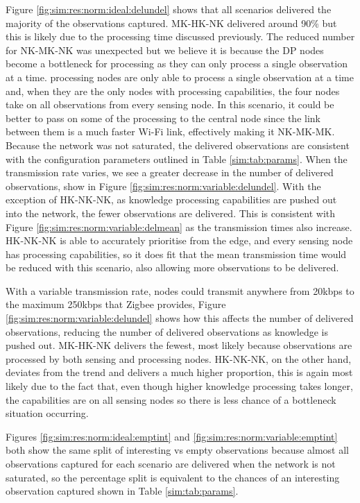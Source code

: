 Figure \ref{fig:sim:res:norm:ideal:delundel} shows that all scenarios delivered the majority of the observations captured. MK-HK-NK delivered around 90\% but this is likely due to the processing time discussed previously. The reduced number for NK-MK-NK was unexpected but we believe it is because the DP nodes become a bottleneck for processing as they can only process a single observation at a time. processing nodes are only able to process a single observation at a time and, when they are the only nodes with processing capabilities, the four nodes take on all observations from every sensing node. In this scenario, it could be better to pass on some of the processing to the central node since the link between them is a much faster Wi-Fi link, effectively making it NK-MK-MK. Because the network was not saturated, the delivered observations are consistent with the configuration parameters outlined in Table \ref{sim:tab:params}. When the transmission rate varies, we see a greater decrease in the number of delivered observations, show in Figure \ref{fig:sim:res:norm:variable:delundel}. With the exception of HK-NK-NK, as knowledge processing capabilities are pushed out into the network, the fewer observations are delivered. This is consistent with Figure \ref{fig:sim:res:norm:variable:delmean} as the transmission times also increase. HK-NK-NK is able to accurately prioritise from the edge, and every sensing node has processing capabilities, so it does fit that the mean transmission time would be reduced with this scenario, also allowing more observations to be delivered.

With a variable transmission rate, nodes could transmit anywhere from 20kbps to the maximum 250kbps that Zigbee provides, Figure \ref{fig:sim:res:norm:variable:delundel} shows how this affects the number of delivered observations, reducing the number of delivered observations as knowledge is pushed out. MK-HK-NK delivers the fewest, most likely because observations are processed by both sensing and processing nodes. HK-NK-NK, on the other hand, deviates from the trend and delivers a much higher proportion, this is again most likely due to the fact that, even though higher knowledge processing takes longer, the capabilities are on all sensing nodes so there is less chance of a bottleneck situation occurring.

Figures \ref{fig:sim:res:norm:ideal:emptint} and \ref{fig:sim:res:norm:variable:emptint} both show the same split of interesting vs empty observations because almost all observations captured for each scenario are delivered when the network is not saturated, so the percentage split is equivalent to the chances of an interesting observation captured shown in Table \ref{sim:tab:params}.

